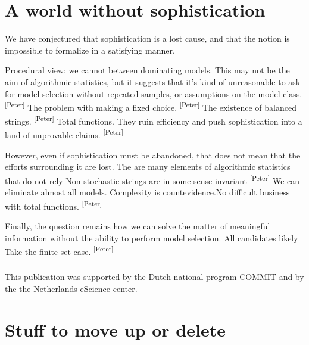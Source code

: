 \documentclass{style/llncs}
\newcommand{\pb}[1]{\textcolor{OliveGreen}{\small #1 \textsuperscript{[Peter]} }}
\begin{document}
\section{A world without sophistication}

We have conjectured that sophistication is a lost cause, and that the notion is impossible to formalize in a satisfying manner. 

\pb{Procedural view: we cannot between dominating models. This may not be the aim of algorithmic statistics, but it suggests that it's kind of unreasonable to ask for model selection without repeated samples, or assumptions on the model class.} 
\pb{The problem with making a fixed choice.}
\pb{The existence of balanced strings.}
\pb{Total functions. They ruin efficiency and push sophistication into a land of unprovable claims.}

However, even if sophistication must be abandoned, that does not mean that the efforts surrounding it are lost. The are many elements of algorithmic statistics that do not rely 
\pb{Non-stochastic strings are in some sense invariant}
\pb{We can eliminate almost all models. Complexity is countevidence.No difficult business with total functions.}

Finally, the question remains how we can solve the matter of meaningful information without the ability to perform model selection. \pb{All candidates likely Take the finite set case. }

\subsubsection*{\ackname}

This publication was supported by the Dutch national program COMMIT and by the the Netherlands eScience center.




\appendix

\section{Stuff to move up or delete}
\end{document}
